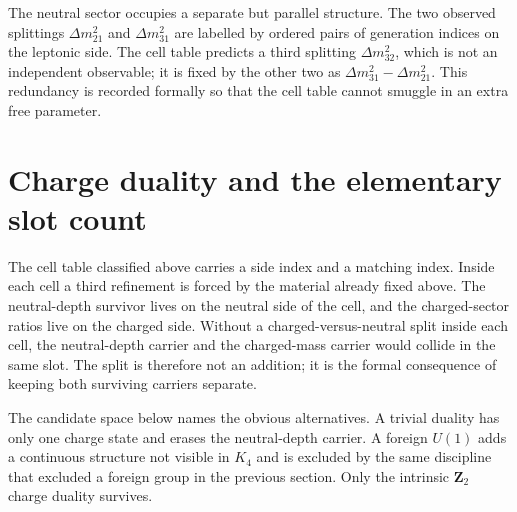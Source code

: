 \documentclass[11pt]{article}
\begin{document}
The neutral sector occupies a separate but parallel structure.  The
two observed splittings $\Delta m^2_{21}$ and $\Delta m^2_{31}$ are
labelled by ordered pairs of generation indices on the leptonic side.
The cell table predicts a third splitting $\Delta m^2_{32}$, which is
not an independent observable; it is fixed by the other two as
$\Delta m^2_{31} - \Delta m^2_{21}$.  This redundancy is recorded
formally so that the cell table cannot smuggle in an extra free
parameter.


\section{Charge duality and the elementary slot count}

The cell table classified above carries a side index and a matching
index.  Inside each cell a third refinement is forced by the material
already fixed above.  The neutral-depth survivor lives on the neutral side of
the cell, and the charged-sector ratios live on the charged side.  Without a
charged-versus-neutral split inside each cell, the neutral-depth carrier and
the charged-mass carrier would collide in the same slot.  The split is
therefore not an addition; it is the formal consequence of keeping both
surviving carriers separate.

The candidate space below names the obvious alternatives.  A trivial
duality has only one charge state and erases the neutral-depth
carrier.  A foreign $U(1)$ adds a continuous structure not visible in
$K_4$ and is excluded by the same discipline that excluded a foreign
group in the previous section.  Only the intrinsic $_2$
charge duality survives.
\end{document}
